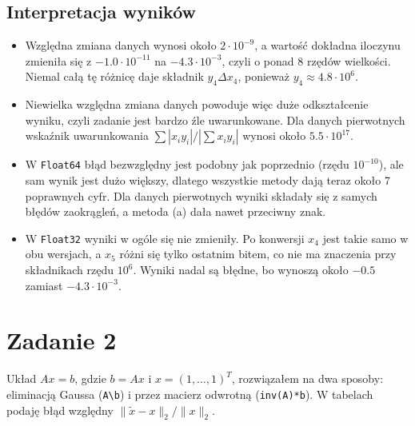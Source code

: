 \documentclass[11pt,a4paper]{article}
\begin{document}
\subsection*{Interpretacja wyników}
\begin{itemize}
    \item Względna zmiana danych wynosi około $2 \cdot 10^{-9}$, a wartość dokładna iloczynu zmieniła się z $-1.0 \cdot 10^{-11}$ na $-4.3 \cdot 10^{-3}$, czyli o ponad 8 rzędów wielkości. Niemal całą tę różnicę daje składnik $y_4 \Delta x_4$, ponieważ $y_4 \approx 4.8 \cdot 10^{6}$.
    \item Niewielka względna zmiana danych powoduje więc duże odkształcenie wyniku, czyli zadanie jest bardzo źle uwarunkowane. Dla danych pierwotnych wskaźnik uwarunkowania $\sum|x_i y_i| / |\sum x_i y_i|$ wynosi około $5.5 \cdot 10^{17}$.
    \item W \texttt{Float64} błąd bezwzględny jest podobny jak poprzednio (rzędu $10^{-10}$), ale sam wynik jest dużo większy, dlatego wszystkie metody dają teraz około 7 poprawnych cyfr. Dla danych pierwotnych wyniki składały się z samych błędów zaokrągleń, a metoda (a) dała nawet przeciwny znak.
    \item W \texttt{Float32} wyniki w ogóle się nie zmieniły. Po konwersji $x_4$ jest takie samo w obu wersjach, a $x_5$ różni się tylko ostatnim bitem, co nie ma znaczenia przy składnikach rzędu $10^{6}$. Wyniki nadal są błędne, bo wynoszą około $-0.5$ zamiast $-4.3 \cdot 10^{-3}$.
\end{itemize}


\section{Zadanie 2}

Układ $Ax = b$, gdzie $b = Ax$ i $x = (1, \dots, 1)^T$, rozwiązałem na dwa sposoby: eliminacją Gaussa (\verb|A\b|) i przez macierz odwrotną (\verb|inv(A)*b|). W tabelach podaję błąd względny $\|\tilde{x} - x\|_2 / \|x\|_2$.
\end{document}
